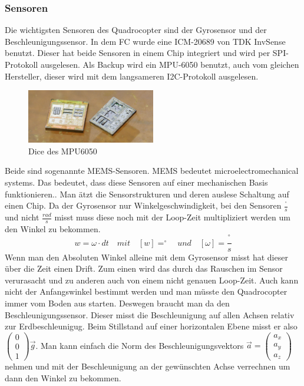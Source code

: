 \documentclass[12pt,a4paper, ngerman]{article}
\begin{document}
\subsubsection{Sensoren}
Die wichtigsten Sensoren des Quadrocopter sind der Gyrosensor und der Beschleunigungssensor. In dem FC wurde eine ICM-20689 von TDK InvSense benutzt. Dieser hat beide Sensoren in einem Chip integriert und wird per SPI-Protokoll ausgelesen. Als Backup wird ein MPU-6050 benutzt, auch vom gleichen Hersteller, dieser wird mit dem langsameren I2C-Protokoll ausgelesen. \\
\begin{figure}
\centering
\includegraphics[width=0.5\textwidth]{1920px-Mpu6050-HD.jpg}
\caption[https://de.wikipedia.org/wiki/TDK]{Dice des MPU6050}
\end{figure}
Beide sind sogenannte MEMS-Sensoren. MEMS bedeutet microelectromechanical systems. Das bedeutet, dass diese Sensoren auf einer mechanischen Basis funktionieren.\cite{website:elek_Komp_MEMS}. Man ätzt die Sensorstrukturen und deren auslese Schaltung auf einen Chip.
\newpage
\noindent
Da der Gyrosensor nur Winkelgeschwindigkeit, bei den Sensoren $\frac{^\circ}{s}$ und nicht $\frac{rad}{s}$ misst muss diese noch mit der Loop-Zeit multipliziert werden um den Winkel zu bekommen.
\begin{equation}
w=\omega\cdot dt \quad mit \quad [w]=^\circ \quad und \quad [\omega]=\frac{^\circ}{s}
\end{equation}
Wenn man den Absoluten Winkel alleine mit dem Gyrosensor misst hat dieser über die Zeit einen Drift. Zum einen wird das durch das Rauschen im Sensor verurasacht und zu anderen auch von einem nicht genauen Loop-Zeit. Auch kann nicht der Anfangswinkel bestimmt werden und man müsste den Quadrocopter immer vom Boden aus starten. Deswegen braucht man da den Beschleunigungssensor. Dieser misst die Beschleunigung auf allen Achsen relativ zur Erdbeschleunigug. Beim Stillstand auf einer horizontalen Ebene misst er also
$
\begin{pmatrix}
0\\ 
0\\ 
1
\end{pmatrix}
\vec{g}
$. Man kann einfach die Norm des Beschleunigungsvektors $\vec{a} = \begin{pmatrix}
a_{x}\\ 
a_{y}\\ 
a_{z}
\end{pmatrix}$ nehmen und mit der Beschleunigung an der gewünschten Achse verrechnen um dann den Winkel zu bekommen.
\end{document}
